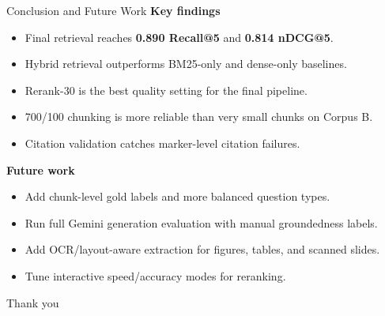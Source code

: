 \documentclass[10pt,aspectratio=169]{beamer}
\newcommand{\key}[1]{\textbf{\textcolor{FreshTeal}{#1}}}
\begin{document}
\begin{frame}{Conclusion and Future Work}
    \textbf{Key findings}
    \begin{itemize}
        \item Final retrieval reaches \key{0.890 Recall@5} and \key{0.814 nDCG@5}.
        \item Hybrid retrieval outperforms BM25-only and dense-only baselines.
        \item Rerank-30 is the best quality setting for the final pipeline.
        \item 700/100 chunking is more reliable than very small chunks on Corpus B.
        \item Citation validation catches marker-level citation failures.
    \end{itemize}

    \vspace{0.6em}
    \textbf{Future work}
    \begin{itemize}
        \item Add chunk-level gold labels and more balanced question types.
        \item Run full Gemini generation evaluation with manual groundedness labels.
        \item Add OCR/layout-aware extraction for figures, tables, and scanned slides.
        \item Tune interactive speed/accuracy modes for reranking.
    \end{itemize}

    \vfill
    \begin{center}
        \Large \textcolor{DeepNavy}{Thank you}
    \end{center}
\end{frame}
\end{document}
